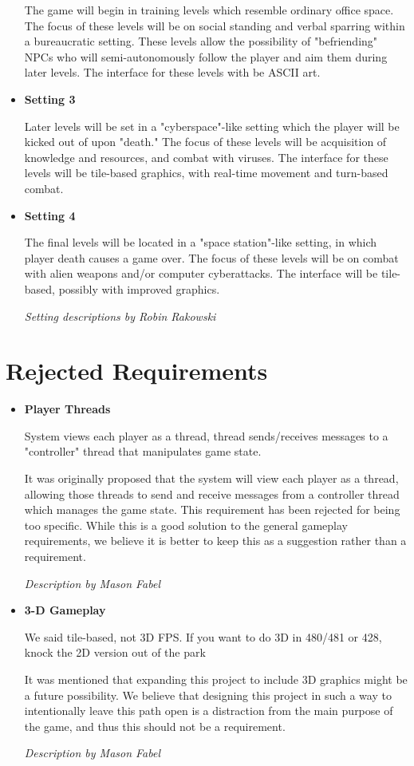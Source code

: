 \documentclass[12pt]{article}
\begin{document}
\begin{itemize}
	The game will begin in training levels which resemble ordinary office 
	space. The focus of these levels will be on social standing and verbal 
	sparring within a bureaucratic setting. These levels allow the possibility 
	of "befriending" NPCs who will semi-autonomously follow the player and aim
	them during later levels. The interface for these levels with be ASCII art.
	
	\item \textbf{Setting 3}
	
	Later levels will be set in a "cyberspace"-like setting which the player will
	be kicked out of upon "death." The focus of these levels will be acquisition of 
	knowledge and resources, and combat with viruses. The interface for these levels 
	will be tile-based graphics, with real-time movement and turn-based combat.
	
	\item \textbf{Setting 4}
	
	The final levels will be located in a "space station"-like setting, in which 
	player death causes a game over. The focus of these levels will be on combat 
	with alien weapons and/or computer cyberattacks. The interface will be tile-based,
	possibly with improved graphics.
	
	\emph{Setting descriptions by Robin Rakowski}
	
\end{itemize}

\section{Rejected Requirements}
\begin{itemize}
	\item \textbf{Player Threads}
	
	System views each player as a thread, thread sends/receives messages
	to a "controller" thread that manipulates game state.
	
	It was originally proposed that the system will view each player as a
	thread, allowing those threads to send and receive messages from a
	controller thread which manages the game state. This requirement has been
	rejected for being too specific. While this is a good solution to the
	general gameplay requirements, we believe it is better to keep this as a
	suggestion rather than a requirement.
	
	\emph{Description by Mason Fabel}
		
	\item \textbf{3-D Gameplay}
	
	We said tile-based, not 3D FPS. If you want to do 3D in 480/481 or
	428, knock the 2D version out of the park 
	
	It was mentioned that expanding this project to include 3D graphics might
	be a future possibility. We believe that designing this project in such a
	way to intentionally leave this path open is a distraction from the main
	purpose of the game, and thus this should not be a requirement.
	
	\emph{Description by Mason Fabel}
	
\end{itemize}
\end{document}
